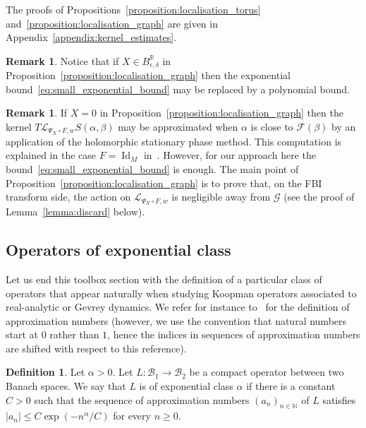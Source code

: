 \documentclass[10pt]{amsart}
\theoremstyle{definition}\newtheorem{defi}[theo]{Definition}\newtheorem{rema}[theo]{Remark}\newtheorem{exam}[theo]{Example}\newtheorem{exem}[theo]{Example}\newtheorem{nota}[theo]{Notation}
\DeclareMathOperator{\Id}{Id}
\newcommand{\p}[1]{\left(#1\right)}
\newcommand{\va}[1]{\left|#1\right|}
\newcommand{\clL}{\mathcal{L}}
\newcommand{\clF}{\mathcal{F}}
\newcommand{\clG}{\mathcal{G}}
\newcommand{\clB}{\mathcal{B}}
\newcommand{\bbN}{\mathbb{N}}
\newcommand{\bbR}{\mathbb{R}}
\begin{document}
The proofs of Propositions~\ref{proposition:localisation_torus} and~\ref{proposition:localisation_graph} are given in Appendix~\ref{appendix:kernel_estimates}.

\begin{rema}
Notice that if $X \in B_{\epsilon,\delta}^{\bbR}$ in Proposition~\ref{proposition:localisation_graph} then the exponential bound~\eqref{eq:small_exponential_bound} may be replaced by a polynomial bound.
\end{rema}

\begin{rema}
If $X = 0$ in Proposition~\ref{proposition:localisation_graph} then the kernel $T \clL_{\Psi_X \circ F,w} S(\alpha,\beta)$ may be approximated when $\alpha$ is close to $\clF(\beta)$ by an application of the holomorphic stationary phase method. This computation is explained in the case $F = \Id_M$ in~\cite[Lemma~2.10]{BJ20}. However, for our approach here the bound~\eqref{eq:small_exponential_bound} is enough. The main point of Proposition~\ref{proposition:localisation_graph} is to prove that, on the FBI transform side, the action on $\clL_{\Psi_X \circ F, w}$ is negligible away from $\clG$ (see the proof of Lemma~\ref{lemma:discard} below).
\end{rema}

\subsection{Operators of exponential class}\label{subsection:exponential_class}

Let us end this toolbox section with the definition of a particular class of operators that appear naturally when studying Koopman operators associated to real-analytic or Gevrey dynamics. We refer for instance to~\cite[\S~2.3.1]{pietsch_book} for the definition of approximation numbers (however, we use the convention that natural numbers start at $0$ rather than $1$, hence the indices in sequences of approximation numbers are shifted with respect to this reference).

\begin{defi}
Let $\alpha >0$. Let $L : \clB_1 \to \clB_2$ be a compact operator between two Banach spaces. We say that $L$ is of exponential class $\alpha$ if there is a constant $C > 0$ such that the sequence of approximation numbers $(a_n)_{n  \in \bbN}$ of $L$ satisfies $\va{a_n} \leq C \exp\p{ - n^\alpha /C}$ for every $n \geq 0$.
\end{defi}
\end{document}
